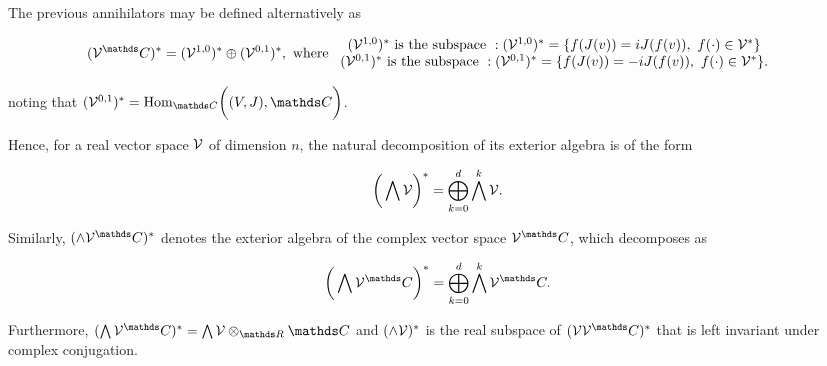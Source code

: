 \begin{remark}
    \textnormal{
    The previous annihilators may be defined alternatively as
    }
    
     \begin{equation*} 
        \begin{split}
            &(\vectorspace^\C)^{*} = (\vectorspace^{1,0})^{*} \oplus (\vectorspace^{0,1})^{*}, \textnormal{ where }\begin{array}{cc}
                 \textnormal{$(\vectorspace^{1,0})^{*}$ is the subspace }: (\vectorspace^{1,0})^{*} = \{ f(J(v)) = i J(f(v)) , \blanky f(\cdot) \in \vectorspace^{*}\}  \\
                \textnormal{$(\vectorspace^{0,1})^{*}$ is the subspace }: (\vectorspace^{0,1})^{*} = \{ f(J(v)) = - i J(f(v)) , \blanky f(\cdot) \in \vectorspace^{*}\}.
            \end{array}
        \end{split}
    \end{equation*}
    
    \textnormal{
    noting that $(\vectorspace^{0,1})^{*} = \textnormal{Hom}_{\C} \bigg((V, J), \C\bigg)$.
    }
\end{remark}

\bigbreak

\begin{lemma}
    
    Hence, for a real vector space $\mathcal{V}$ of dimension $n$, the natural decomposition of its exterior algebra is of the form 
    
    \begin{equation}
        \bigg(\bigwedge \mathcal{V}\bigg)^{*} = \bigoplus_{k=0}^{d} \bigwedge^k \mathcal{V}.
    \end{equation}
    
    Similarly, $(\wedge \vectorspace^\C)^{*}$ denotes the exterior algebra of the complex vector space $\vectorspace^\C$, which decomposes as 
    
    \begin{equation}
        \bigg(\bigwedge \vectorspace^\C\bigg)^{*} = \bigoplus_{k=0}^{d} \bigwedge^k \vectorspace^\C.
    \end{equation}
    
    Furthermore, $(\bigwedge \vectorspace^\C )^{*} = \bigwedge \vectorspace \otimes_{\R} \C$ and $(\wedge \mathcal{V})^{*}$ is the real subspace of $(\vectorspace \vectorspace^\C)^{*}$ that is left invariant under complex conjugation. 
\end{lemma}

